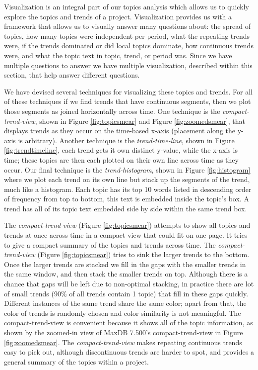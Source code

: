 \documentclass[times, 10pt,twocolumn]{article}
\newcommand{\shrinkit}{\vspace*{-.3em}}
\begin{document}
\shrinkit
{}
\shrinkit
  Visualization is an integral part of our topics analysis which
  allows us to quickly explore the topics and trends of a project.
  Visualization provides us with a framework that allows us to
  visually answer many questions about: the spread of topics, how many
  topics were independent per period, what the repeating trends were,
  if the trends dominated or did local topics dominate, how continuous
  trends were, and what the topic text in topic, trend, or period was.
  Since we have multiple questions to answer we have multiple
  visualization, described within this section, that help answer
  different questions.  

We have devised several techniques for visualizing these topics and
trends.  For all of these techniques if we find trends that have
continuous segments, then we plot those segments as joined
horizontally across time. One technique is the \emph{compact-trend-view},
shown in Figure \ref{fig:topicsmear} and Figure \ref{fig:zoomedsmear},
that displays trends as they occur on the time-based x-axis
(placement along the y-axis is arbitrary).  Another technique is
the \emph{trend-time-line}, shown in Figure \ref{fig:trendtimeline},
each trend gets it own distinct y-value, while the x-axis is time;
these topics are then each plotted on their own line across time as
they occur. Our final technique is the \emph{trend-histogram}, shown in Figure
\ref{fig:histogram} where we plot each trend on its own line but stack
up the segments of the trend, much like a histogram. Each topic has its top 10 words 
listed in descending order of frequency from top to bottom, this text is embedded inside the topic's box.
A trend has all of its topic text embedded side by side within the same trend box.


 The \emph{compact-trend-view} (Figure \ref{fig:topicsmear})
  attempts to show all topics and trends at once across time in a
  compact view that could fit on one page. It tries to give a compact
  summary of the topics and trends across time.   The
\emph{compact-trend-view} (Figure \ref{fig:topicsmear}) tries to sink
the larger trends to the bottom.  Once the larger trends are stacked
we fill in the gaps with the smaller trends in the same window, and
then stack the smaller trends on top.  Although there is a chance that
gaps will be left due to non-optimal stacking, in practice there are
lot of small trends (90\% of all trends contain 1 topic) that fill in
these gaps quickly.  Different instances of the same trend share the
same color; apart from that, the color of trends is randomly chosen
and color similarity is not meaningful.  The compact-trend-view is
convenient because it shows all of the topic information, as shown by
the zoomed-in view of MaxDB 7.500's compact-trend-view in Figure
\ref{fig:zoomedsmear}. The \emph{compact-trend-view} makes repeating
continuous trends easy to pick out, although discontinuous trends are
harder to spot, and provides a general summary of the topics within a project.
\end{document}
